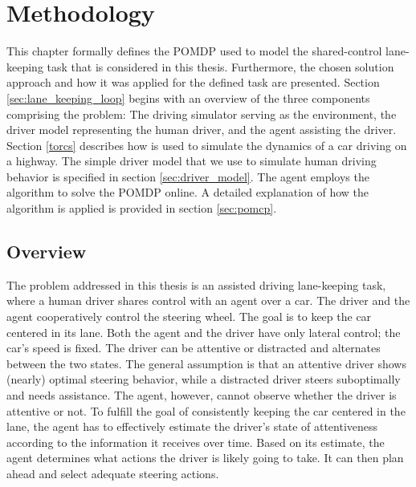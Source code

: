 \chapter{Methodology}
\label{ch:problem}



This chapter formally defines the POMDP used to model the shared-control lane-keeping task that is considered in this thesis. Furthermore, the chosen solution approach and how it was applied for the defined task are presented. Section \ref{sec:lane_keeping_loop} begins with an overview of the three components comprising the problem: The driving simulator serving as the environment, the driver model representing the human driver, and the agent assisting the driver. Section \ref{torcs} describes how  is used to simulate the dynamics of a car driving on a highway. The simple driver model that we use to simulate human driving behavior is specified in section \ref{sec:driver_model}. The agent employs the  algorithm to solve the POMDP online. A detailed explanation of how the algorithm is applied is provided in section \ref{sec:pomcp}.

\section{Overview}

The problem addressed in this thesis is an assisted driving lane-keeping task, where a human driver shares control with an agent over a car. The driver and the agent cooperatively control the steering wheel. The goal is to keep the car centered in its lane. Both the agent and the driver have only lateral control; the car's speed is fixed. The driver can be attentive or distracted and alternates between the two states. The general assumption is that an attentive driver shows (nearly) optimal steering behavior, while a distracted driver steers suboptimally and needs assistance. The agent, however, cannot observe whether the driver is attentive or not. To fulfill the goal of consistently keeping the car centered in the lane, the agent has to effectively estimate the driver's state of attentiveness according to the information it receives over time. Based on its estimate, the agent determines what actions the driver is likely going to take. It can then plan ahead and select adequate steering actions.


